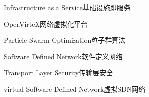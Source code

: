 

{Infrastructure as a Service}{基础设施即服务}

{OpenVirteX}{网络虚拟化平台}


{Particle Swarm Optimization}{粒子群算法}

{Software Defined Network}{软件定义网络}

{Transport Layer Security}{传输层安全}

{virtual Software Defined Network}{虚拟SDN网络}